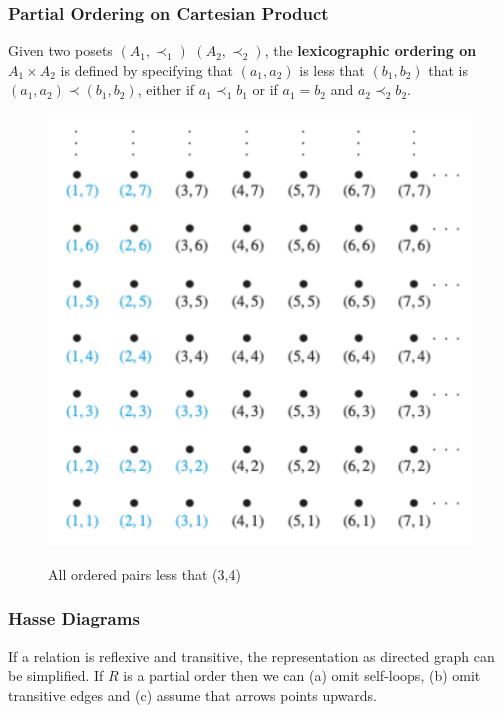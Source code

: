 \documentclass{article}
\begin{document}
\subsubsection{Partial Ordering on Cartesian Product} Given two posets $ (A_1,\prec_1) $ $ (A_2,\prec_2) $, the \textbf{lexicographic ordering on $ A_1 \times A_2 $} is defined by specifying that $ (a_1,a_2) $ is less that $ (b_1,b_2) $ that is $ (a_1,a_2) \prec (b_1,b_2) $, either if $ a_1 \prec_1 b_1 $ or if $ a_1 = b_2 $ and $ a_2 \prec_2 b_2 $.

\begin{figure}[h]
  \includegraphics[width=\linewidth]{lexicographic.png}
  \label{fig:lexicographic}
	
\caption{All ordered pairs less that (3,4)} 	
\end{figure}

\subsubsection{Hasse Diagrams} If a relation is reflexive and transitive, the representation as directed graph can be simplified. If $ R $ is a partial order then we can (a) omit self-loops, (b) omit transitive edges and (c) assume that arrows points upwards.
\end{document}

